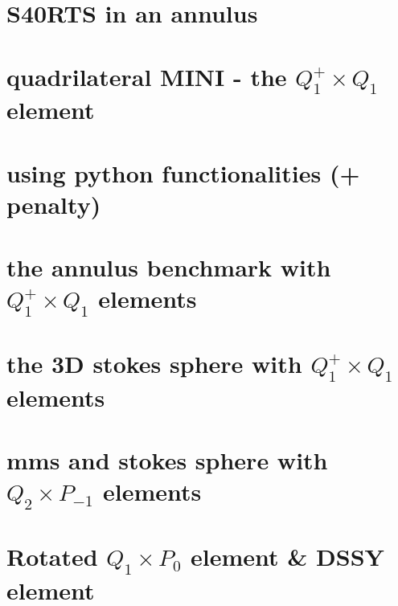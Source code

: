 \documentclass[a4paper,11pt]{report}
\begin{document}
\chapter{S40RTS in an annulus \label{f71}} %

\chapter{quadrilateral MINI - the $Q_1^+\times Q_1$ element \label{f72}} %

\chapter{using python functionalities (\QonePzero + penalty)\label{f73}} %

\chapter{the annulus benchmark with $Q_1^+\times Q_1$ elements \label{f74}} %

\chapter{the 3D stokes sphere with $Q_1^+\times Q_1$ elements \label{f75}} %

\chapter{mms and stokes sphere with $Q_2\times P_{-1}$ elements \label{f76}} %

\chapter{Rotated $Q_1\times P_0$ element \& DSSY element \label{f77}} %
\end{document}

